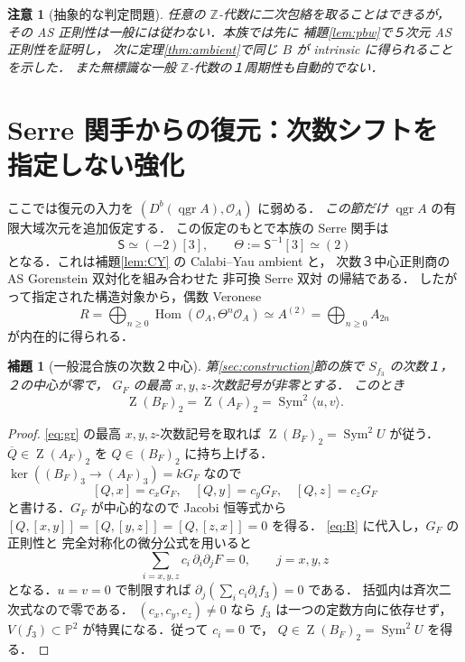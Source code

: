 \documentclass[11pt,a4paper]{ltjsarticle}
\numberwithin{equation}{section}
\newtheorem{lemma}[theorem]{補題}
\newtheorem{remark}[theorem]{注意}
\newcommand{\PP}{\mathbb P}
\newcommand{\OO}{\mathcal O}
\newcommand{\Sym}{\operatorname{Sym}}
\newcommand{\qgr}{\operatorname{qgr}}
\newcommand{\Hom}{\operatorname{Hom}}
\newcommand{\Z}{\operatorname{Z}}
\begin{document}
\begin{remark}[抽象的な判定問題]\label{rem:abstract}
任意の $\mathbb Z$-代数に二次包絡を取ることはできるが，
その AS 正則性は一般には従わない．本族では\emph{先に}
補題\ref{lem:pbw}で５次元 AS 正則性を証明し，
次に定理\ref{thm:ambient}で同じ $B$ が intrinsic に得られることを示した．
また無標識な一般 $\mathbb Z$-代数の１周期性も自動的でない．
\end{remark}

\section{Serre 関手からの復元：次数シフトを指定しない強化}\label{sec:serre}
ここでは復元の入力を $(D^b(\qgr A),\OO_A)$ に弱める．
\emph{この節だけ} $\qgr A$ の有限大域次元を追加仮定する．
この仮定のもとで本族の Serre 関手は
\begin{equation}\label{eq:Serre}
 \mathsf S\simeq(-2)[3],\qquad
 \Theta:=\mathsf S^{-1}[3]\simeq(2)
\end{equation}
となる．これは補題\ref{lem:CY} の Calabi--Yau ambient と，
次数３中心正則商の AS Gorenstein 双対化を組み合わせた
非可換 Serre 双対 \cite{YZ} の帰結である．
したがって指定された構造対象から，偶数 Veronese
\begin{equation}\label{eq:even}
 R=\bigoplus_{n\ge0}\Hom(\OO_A,\Theta^n\OO_A)
 \simeq A^{(2)}=\bigoplus_{n\ge0}A_{2n}
\end{equation}
が内在的に得られる．

\begin{lemma}[一般混合族の次数２中心]\label{lem:center2}
第\ref{sec:construction}節の族で $S_{f_3}$ の次数１，２の中心が零で，
$G_F$ の最高 $x,y,z$-次数記号が非零とする．
このとき
\begin{equation}\label{eq:center2}
 \Z(B_F)_2=\Z(A_F)_2=\Sym^2\langle u,v\rangle.
\end{equation}
\end{lemma}
\begin{proof}
\eqref{eq:gr} の最高 $x,y,z$-次数記号を取れば
$\Z(B_F)_2=\Sym^2U$ が従う．
$\overline Q\in\Z(A_F)_2$ を $Q\in(B_F)_2$ に持ち上げる．
$\ker((B_F)_3\to(A_F)_3)=kG_F$ なので
\[
 [Q,x]=c_xG_F,\quad [Q,y]=c_yG_F,\quad [Q,z]=c_zG_F
\]
と書ける．$G_F$ が中心的なので Jacobi 恒等式から
$[Q,[x,y]]=[Q,[y,z]]=[Q,[z,x]]=0$ を得る．
\eqref{eq:B} に代入し，$G_F$ の正則性と
完全対称化の微分公式を用いると
\[
 \sum_{i=x,y,z}c_i\,\partial_i\partial_j F=0,
 \qquad j=x,y,z
\]
となる．$u=v=0$ で制限すれば
$\partial_j(\sum_i c_i\partial_i f_3)=0$ である．
括弧内は斉次二次式なので零である．
$(c_x,c_y,c_z)\ne0$ なら $f_3$ は一つの定数方向に依存せず，
$V(f_3)\subset\PP^2$ が特異になる．従って $c_i=0$ で，
$Q\in\Z(B_F)_2=\Sym^2U$ を得る．
\end{proof}
\end{document}
